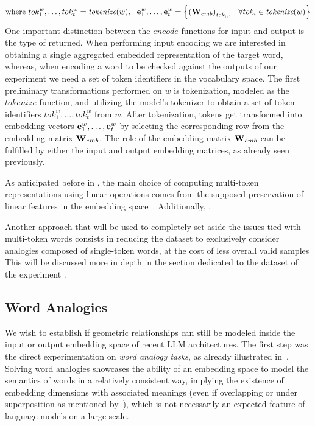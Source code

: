 \vspace{0.25em}
\begin{equation*}
    \text{where}\  tok_1^w,\ldots,tok_t^w = \textit{tokenize}(w)
    ,\ \ \bm{\mathbf{e}}_1^w, \ldots, \bm{\mathbf{e}}_{t}^w = \Bigl\{ {{(\bm{\mathbf{W}}_{emb})}_{\textit{tok}_{i},\cdot}} \ |\ \forall tok_i \in \textit{tokenize}(w) \Bigr\}
\end{equation*}
One important distinction between the $\textit{encode}$ functions for input and output is the type of  returned.
When performing input encoding we are interested in obtaining a single aggregated embedded representation of the target word, whereas, when encoding a word to be checked against the outputs of our experiment we need a set of token identifiers in the vocabulary space.
The first preliminary transformations performed on $w$ is tokenization, modeled as the $\textit{tokenize}$ function, and utilizing the model's tokenizer to obtain a set of token identifiers $tok_1^w,\ldots,tok_t^w$ from $w$.
After tokenization, tokens get transformed into embedding vectors $\bm{\mathbf{e}}_1^w, \ldots, \bm{\mathbf{e}}_{t}^w$ by selecting the corresponding row from the embedding matrix $\bm{\mathbf{W}}_{emb}$.
The role of the embedding matrix $\bm{\mathbf{W}}_{emb}$ can be fulfilled by either the input and output embedding matrices, as already seen previously.

As anticipated before in , the main choice of computing multi-token representations using linear operations comes from the supposed preservation of linear features in the embedding space~\cite{mikolov2013,park2023}.
Additionally, .

Another approach that will be used to completely set aside the issues tied with multi-token words consists in reducing the dataset to exclusively consider analogies composed of single-token words, at the cost of less overall valid samples
This will be discussed more in depth in the section dedicated to the dataset of the experiment .

\subsection{Word Analogies}\label{ssec:method_embeddings_analogies}

We wish to establish if geometric relationships can still be modeled inside the input or output embedding space of recent LLM architectures.
The first step  was the direct experimentation on \emph{word analogy tasks}, as already illustrated in~\citet{mikolov2013}.
Solving word analogies showcases the ability of an embedding space to model the semantics of words in a relatively consistent way, implying the existence of embedding dimensions with associated meanings (even if overlapping or under superposition as mentioned by~\citet{elhage2022,henighan2023}), which is not necessarily an expected feature of language models on a large scale.

